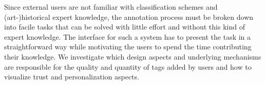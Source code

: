 Since external users are not familiar with classification schemes and (art-)historical expert knowledge, the annotation process must be broken down into facile tasks that can be solved with little effort and without this kind of expert knowledge. %
The interface for such a system has to present the task in a straightforward way while motivating the users to spend the time contributing their knowledge. We investigate which design aspects and underlying mechanisms are responsible for the quality and quantity of tags added by users and how to visualize trust and personalization aspects.

